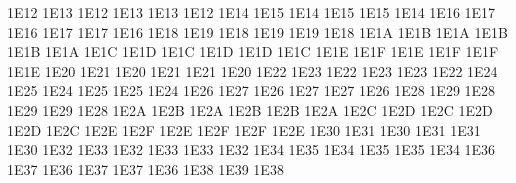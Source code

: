 \setcclcuc 1E12 1E13 1E12 %
\setcclcuc 1E13 1E13 1E12 %
\setcclcuc 1E14 1E15 1E14 %
\setcclcuc 1E15 1E15 1E14 %
\setcclcuc 1E16 1E17 1E16 %
\setcclcuc 1E17 1E17 1E16 %
\setcclcuc 1E18 1E19 1E18 %
\setcclcuc 1E19 1E19 1E18 %
\setcclcuc 1E1A 1E1B 1E1A %
\setcclcuc 1E1B 1E1B 1E1A %
\setcclcuc 1E1C 1E1D 1E1C %
\setcclcuc 1E1D 1E1D 1E1C %
\setcclcuc 1E1E 1E1F 1E1E %
\setcclcuc 1E1F 1E1F 1E1E %
\setcclcuc 1E20 1E21 1E20 %
\setcclcuc 1E21 1E21 1E20 %
\setcclcuc 1E22 1E23 1E22 %
\setcclcuc 1E23 1E23 1E22 %
\setcclcuc 1E24 1E25 1E24 %
\setcclcuc 1E25 1E25 1E24 %
\setcclcuc 1E26 1E27 1E26 %
\setcclcuc 1E27 1E27 1E26 %
\setcclcuc 1E28 1E29 1E28 %
\setcclcuc 1E29 1E29 1E28 %
\setcclcuc 1E2A 1E2B 1E2A %
\setcclcuc 1E2B 1E2B 1E2A %
\setcclcuc 1E2C 1E2D 1E2C %
\setcclcuc 1E2D 1E2D 1E2C %
\setcclcuc 1E2E 1E2F 1E2E %
\setcclcuc 1E2F 1E2F 1E2E %
\setcclcuc 1E30 1E31 1E30 %
\setcclcuc 1E31 1E31 1E30 %
\setcclcuc 1E32 1E33 1E32 %
\setcclcuc 1E33 1E33 1E32 %
\setcclcuc 1E34 1E35 1E34 %
\setcclcuc 1E35 1E35 1E34 %
\setcclcuc 1E36 1E37 1E36 %
\setcclcuc 1E37 1E37 1E36 %
\setcclcuc 1E38 1E39 1E38 %
